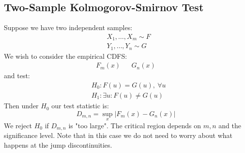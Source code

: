 \documentclass[12pt]{article}
\begin{document}
\subsection{Two-Sample Kolmogorov-Smirnov Test}
Suppose we have two independent samples:
\begin{align*}
    &X_1,\dots,X_m\sim F \\
    &Y_1,\dots,Y_n\sim G
\end{align*}
We wish to consider the empirical CDFS:
\begin{align*}
    F_m(x)&&G_n(x)
\end{align*}
and test:
\begin{align*}
    &H_0:F(u)=G(u),\ \forall u \\
    &H_1:\exists u: F(u)\ne G(u)
\end{align*}
Then under \(H_0\) our test statistic is:
\[D_{m,n}=\sup_x|F_m(x)-G_n(x)|\]
We reject \(H_0\) if \(D_{m,n}\) is "too large". The critical region depends on \(m,n\) and the significance level. Note that in this case we do not need to worry about what happens at the jump discontinuities.
\end{document}
